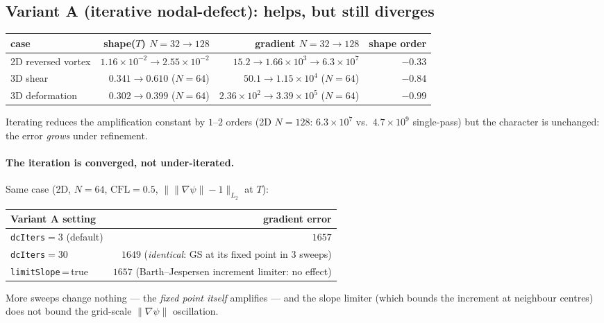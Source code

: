 \documentclass[11pt]{article}
\newcommand{\gradpsi}{\lVert\nabla\psi\rVert}
\newcommand{\code}[1]{\texttt{#1}}
\begin{document}
\subsection{Variant A (iterative nodal-defect): helps, but still diverges}
\begin{center}
\begin{tabular}{l r r r}
\toprule
case & shape($T$) $N{=}32\!\to\!128$ & gradient $N{=}32\!\to\!128$ & shape order \\
\midrule
2D reversed vortex & $1.16\!\times\!10^{-2}\!\to\!2.55\!\times\!10^{-2}$ & $15.2 \to 1.66\!\times\!10^{3}\to 6.3\!\times\!10^{7}$ & $-0.33$ \\
3D shear           & $0.341 \to 0.610$ ($N{=}64$) & $50.1 \to 1.15\!\times\!10^{4}$ ($N{=}64$) & $-0.84$ \\
3D deformation     & $0.302 \to 0.399$ ($N{=}64$) & $2.36\!\times\!10^{2}\to 3.39\!\times\!10^{5}$ ($N{=}64$) & $-0.99$ \\
\bottomrule
\end{tabular}
\end{center}
Iterating reduces the amplification constant by $1$--$2$ orders (2D $N{=}128$:
$6.3\!\times\!10^{7}$ vs.\ $4.7\!\times\!10^{9}$ single-pass) but the character is
unchanged: the error \emph{grows} under refinement.

\paragraph{The iteration is converged, not under-iterated.}
Same case (2D, $N{=}64$, $\mathrm{CFL}=0.5$, $\lVert\gradpsi-1\rVert_{L_2}$ at $T$):
\begin{center}
\begin{tabular}{l r}
\toprule
Variant A setting & gradient error \\
\midrule
\code{dcIters}$=3$ (default)      & $1657$ \\
\code{dcIters}$=30$               & $1649$ \quad(\emph{identical}: GS at its fixed point in 3 sweeps) \\
\code{limitSlope}\,=\,true        & $1657$ \quad(Barth--Jespersen increment limiter: no effect) \\
\bottomrule
\end{tabular}
\end{center}
More sweeps change nothing --- the \emph{fixed point itself} amplifies --- and the
slope limiter (which bounds the increment at neighbour centres) does not bound the
grid-scale $\gradpsi$ oscillation.
\end{document}
